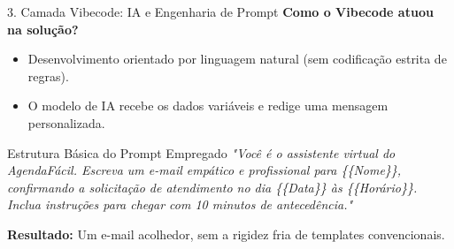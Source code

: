 \documentclass[aspectratio=169, 10pt]{beamer}
\begin{document}
\begin{frame}{3. Camada Vibecode: IA e Engenharia de Prompt}
    \textbf{Como o Vibecode atuou na solução?}
    \begin{itemize}
        \item Desenvolvimento orientado por linguagem natural (sem codificação estrita de regras).
        \item O modelo de IA recebe os dados variáveis e redige uma mensagem personalizada.
    \end{itemize}

    \vspace{0.2cm}
    \begin{exampleblock}{Estrutura Básica do Prompt Empregado}
        \textit{"Você é o assistente virtual do AgendaFácil. Escreva um e-mail empático e profissional para \{\{Nome\}\}, confirmando a solicitação de atendimento no dia \{\{Data\}\} às \{\{Horário\}\}. Inclua instruções para chegar com 10 minutos de antecedência."}
    \end{exampleblock}

    \vspace{0.2cm}
    \textbf{Resultado:} Um e-mail acolhedor, sem a rigidez fria de templates convencionais.
\end{frame}
\end{document}
